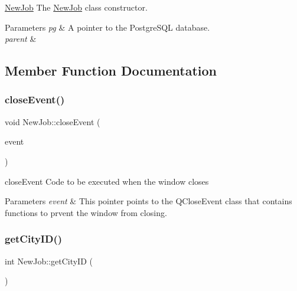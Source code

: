 \hyperlink{class_new_job}{New\+Job} The \hyperlink{class_new_job}{New\+Job} class constructor. 


\begin{DoxyParams}{Parameters}
{\em pg} & A pointer to the Postgre\+S\+QL database. \\
\hline
{\em parent} & \\
\hline
\end{DoxyParams}


\subsection{Member Function Documentation}
\mbox{\label{class_new_job_a84f6390f63ce01fb860b375f53f9c68d}} 
\subsubsection{\texorpdfstring{close\+Event()}{closeEvent()}}
{\footnotesize\ttfamily void New\+Job\+::close\+Event (\begin{DoxyParamCaption}\item[{Q\+Close\+Event $\ast$}]{event }\end{DoxyParamCaption})\hspace{0.3cm}{\ttfamily [override]}}



close\+Event Code to be executed when the window closes 


\begin{DoxyParams}{Parameters}
{\em event} & This pointer points to the Q\+Close\+Event class that contains functions to prvent the window from closing. \\
\hline
\end{DoxyParams}
\mbox{\label{class_new_job_aed4a9a6fa7eab69062c1d36afd58cd75}} 
\subsubsection{\texorpdfstring{get\+City\+I\+D()}{getCityID()}}
{\footnotesize\ttfamily int New\+Job\+::get\+City\+ID (\begin{DoxyParamCaption}{ }\end{DoxyParamCaption})}



